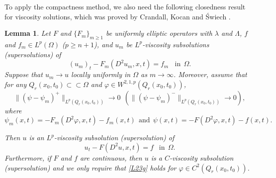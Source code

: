 \documentclass[preprint,12pt]{elsarticle}
\newtheorem{lemma}[theorem]{Lemma}
\theoremstyle{definition}
\theoremstyle{remark}
\numberwithin{equation}{section}
\begin{document}
%

To apply the compactness method, we also need the following closedness result for viscosity solutions, which was proved by Crandall, Kocan and \'{S}wi\polhk ech \cite{MR1789919}.

\begin{lemma}\label{L23}
Let $F$ and $\{F_m\}_{m\geq 1}$ be uniformly elliptic operators with $\lambda$ and $\Lambda$, $f$ and $f_m \in L^p(\Omega)$ ($p\geq n+1$), and $u_m$ be $L^p$-viscosity subsolutions (supersolutions) of
\begin{equation*}
  (u_m)_t-F_m(D^2u_m,x,t)=f_m~~~~\mbox{in}~~\Omega.
\end{equation*}
Suppose that $u_m\rightarrow u$ locally uniformly in $\Omega$ as $m\rightarrow \infty$. Moreover, assume that for any $Q_r(x_0,t_0)\subset \subset \Omega$ and $\varphi \in W^{2,1,p}(Q_r(x_0,t_0))$,
\begin{equation}\label{L23g}
  \|(\psi-\psi_m)^+\|_{L^p(Q_r(x_0,t_0))}\rightarrow 0 ~~\left(\|(\psi-\psi_m)^-\|_{L^p(Q_r(x_0,t_0))}\rightarrow 0\right),
\end{equation}
where
\begin{equation*}
  \psi_m(x,t)=-F_m(D^2\varphi,x,t)-f_m(x,t)~~\mbox{and}~~\psi(x,t)=-F(D^2\varphi,x,t)-f(x,t).
\end{equation*}

Then $u$ is an $L^p$-viscosity subsolution (supersolution) of
\begin{equation*}
u_t-F(D^2u,x,t)=f~~\mbox{ in}~~\Omega.
\end{equation*}
Furthermore, if $F$ and $f$ are continuous, then $u$ is a $C$-viscosity subsolution (supersolution) and we only require that \cref{L23g} holds for $\varphi \in C^2(Q_r(x_0,t_0))$.
\end{lemma}
\end{document}
